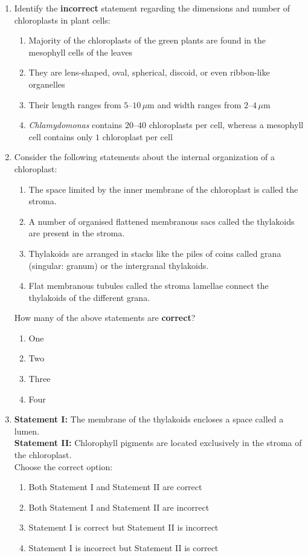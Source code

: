 \documentclass[11pt, a4paper]{article}
\begin{document}
\begin{enumerate}[label=\textbf{\arabic*.}, leftmargin=*, itemsep=8pt]
    \item Identify the \textbf{incorrect} statement regarding the dimensions and number of chloroplasts in plant cells:
    \begin{enumerate}[label=(\alph*)]
        \item Majority of the chloroplasts of the green plants are found in the mesophyll cells of the leaves
        \item They are lens-shaped, oval, spherical, discoid, or even ribbon-like organelles
        \item Their length ranges from $5\text{--}10\,\mu\text{m}$ and width ranges from $2\text{--}4\,\mu\text{m}$
        \item \textit{Chlamydomonas} contains $20\text{--}40$ chloroplasts per cell, whereas a mesophyll cell contains only $1$ chloroplast per cell
    \end{enumerate}

    \item Consider the following statements about the internal organization of a chloroplast:
    \begin{enumerate}[label=(\roman*)]
        \item The space limited by the inner membrane of the chloroplast is called the stroma.
        \item A number of organised flattened membranous sacs called the thylakoids are present in the stroma.
        \item Thylakoids are arranged in stacks like the piles of coins called grana (singular: granum) or the intergranal thylakoids.
        \item Flat membranous tubules called the stroma lamellae connect the thylakoids of the different grana.
    \end{enumerate}
    How many of the above statements are \textbf{correct}?
    \begin{enumerate}[label=(\alph*)]
        \item One
        \item Two
        \item Three
        \item Four
    \end{enumerate}

    \item \textbf{Statement I:} The membrane of the thylakoids encloses a space called a lumen.\\
    \textbf{Statement II:} Chlorophyll pigments are located exclusively in the stroma of the chloroplast.\\
    Choose the correct option:
    \begin{enumerate}[label=(\alph*)]
        \item Both Statement I and Statement II are correct
        \item Both Statement I and Statement II are incorrect
        \item Statement I is correct but Statement II is incorrect
        \item Statement I is incorrect but Statement II is correct
    \end{enumerate}


\end{enumerate}
\end{document}
